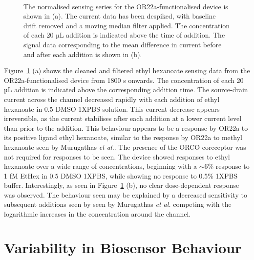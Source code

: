 \documentclass[
  a4paper,
]{scrbook}
\begin{document}
\begin{figure}
\begin{minipage}[t]{0.70\linewidth}
{{}

}

\end{minipage}%
%
\begin{minipage}[t]{0.15\linewidth}

{\centering 

~

}

\end{minipage}%

\caption{\label{fig-OR22a-sensing-series}The normalised sensing series
for the OR22a-functionalised device is shown in (a). The current data
has been despiked, with baseline drift removed and a moving median
filter applied. The concentration of each 20 µL addition is indicated
above the time of addition. The signal data corresponding to the mean
difference in current before and after each addition is shown in (b).}

\end{figure}

Figure~\ref{fig-OR22a-sensing-series} (a) shows the cleaned and filtered
ethyl hexanoate sensing data from the OR22a-functionalised device from
1800 s onwards. The concentration of each 20 µL addition is indicated
above the corresponding addition time. The source-drain current across
the channel decreased rapidly with each addition of ethyl hexanoate in
\(0.5%
\) DMSO 1XPBS solution. This current decrease appears irreversible, as
the current stabilises after each addition at a lower current level than
prior to the addition. This behaviour appears to be a response by OR22a
to its positive ligand ethyl hexanoate, similar to the response by OR22a
to methyl hexanoate seen by Murugathas \emph{et al.}. The presence of
the ORCO coreceptor was not required for responses to be seen. The
device showed responses to ethyl hexanoate over a wide range of
concentrations, beginning with a \(\sim 6\)\% response to 1 fM EtHex in
\(0.5%
\) DMSO 1XPBS, while showing no response to 0.5\% 1XPBS buffer.
Interestingly, as seen in Figure~\ref{fig-OR22a-sensing-series} (b), no
clear dose-dependent response was observed. The behaviour seen may be
explained by a decreased sensitivity to subsequent additions seen by
seen by Murugathas \emph{et al.} \autocite{Murugathas2019b} competing
with the logarithmic increases in the concentration around the channel.

\hypertarget{sec-variability}{%
\section{Variability in Biosensor Behaviour}\label{sec-variability}}
\end{document}
